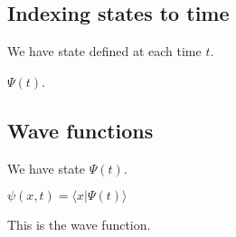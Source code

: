
\subsection{Indexing states to time}

We have state defined at each time \(t\).

\(\Psi (t)\).

\subsection{Wave functions}

We have state \(\Psi (t)\).

\(\psi(x,t)=\langle x\rvert \Psi (t) \rangle\)

This is the wave function.

